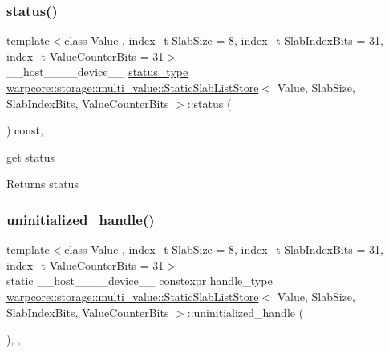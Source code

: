 \subsubsection{\texorpdfstring{status()}{status()}}
{\footnotesize\ttfamily template$<$class Value , index\+\_\+t Slab\+Size = 8, index\+\_\+t Slab\+Index\+Bits = 31, index\+\_\+t Value\+Counter\+Bits = 31$>$ \\
\+\_\+\+\_\+host\+\_\+\+\_\+\+\_\+\+\_\+device\+\_\+\+\_\+ \hyperlink{classwarpcore_1_1Status}{status\+\_\+type} \hyperlink{classwarpcore_1_1storage_1_1multi__value_1_1StaticSlabListStore}{warpcore\+::storage\+::multi\+\_\+value\+::\+Static\+Slab\+List\+Store}$<$ Value, Slab\+Size, Slab\+Index\+Bits, Value\+Counter\+Bits $>$\+::status (\begin{DoxyParamCaption}{ }\end{DoxyParamCaption}) const\hspace{0.3cm}{\ttfamily [inline]}, {\ttfamily [noexcept]}}



get status 

\begin{DoxyReturn}{Returns}
status 
\end{DoxyReturn}
\mbox{\label{classwarpcore_1_1storage_1_1multi__value_1_1StaticSlabListStore_a2af9e523c1c3655b7b7786698e02e9b5}} 
\subsubsection{\texorpdfstring{uninitialized\+\_\+handle()}{uninitialized\_handle()}}
{\footnotesize\ttfamily template$<$class Value , index\+\_\+t Slab\+Size = 8, index\+\_\+t Slab\+Index\+Bits = 31, index\+\_\+t Value\+Counter\+Bits = 31$>$ \\
static \+\_\+\+\_\+host\+\_\+\+\_\+\+\_\+\+\_\+device\+\_\+\+\_\+ constexpr handle\+\_\+type \hyperlink{classwarpcore_1_1storage_1_1multi__value_1_1StaticSlabListStore}{warpcore\+::storage\+::multi\+\_\+value\+::\+Static\+Slab\+List\+Store}$<$ Value, Slab\+Size, Slab\+Index\+Bits, Value\+Counter\+Bits $>$\+::uninitialized\+\_\+handle (\begin{DoxyParamCaption}{ }\end{DoxyParamCaption})\hspace{0.3cm}{\ttfamily [inline]}, {\ttfamily [static]}, {\ttfamily [noexcept]}}



